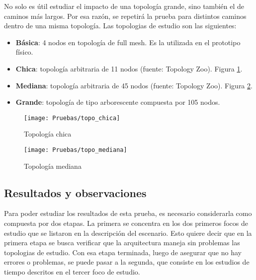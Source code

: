 No solo es útil estudiar el impacto de una topología grande, sino también el de caminos más largos. Por esa razón, se repetirá la prueba para distintos caminos dentro de una misma topología. Las topologias de estudio son las siguientes:
\begin{itemize}
	\item \textbf{Básica}: 4 nodos en topología de full mesh. Es la utilizada en el prototipo físico.
	\item \textbf{Chica}: topología arbitraria de 11 nodos (fuente: Topology Zoo). Figura \ref{fig:topo_chica}.
	\item \textbf{Mediana}: topología arbitraria de 45 nodos (fuente: Topology Zoo). Figura \ref{fig:topo_mediana}.
	\item \textbf{Grande}: topología de tipo arborescente compuesta por 105 nodos.
\end{itemize}

\begin{figure}[t]
\caption{Topología chica}
\texttt{[image: Pruebas/topo\_chica]}
\centering
\label{fig:topo_chica}
\end{figure}

\begin{figure}[t]
\caption{Topología mediana}
\texttt{[image: Pruebas/topo\_mediana]}
\centering
\label{fig:topo_mediana}
\end{figure}

\subsection{Resultados y observaciones}
Para poder estudiar los resultados de esta prueba, es necesario considerarla como compuesta por dos etapas. La primera se concentra en los dos primeros focos de estudio que se listaron en la descripción del escenario. Esto quiere decir que en la primera etapa se busca verificar que la arquitectura maneja sin problemas las topologias de estudio. Con esa etapa terminada, luego de asegurar que no hay errores o problemas, se puede pasar a la segunda, que consiste en los estudios de tiempo descritos en el tercer foco de estudio.

\begin{table}[ht]
	\caption{Pasos que cumple cada caso en la creación exitosa de un servicio.}
	\centering 
	\label{table:problemas_por_topologia}
\end{table}

